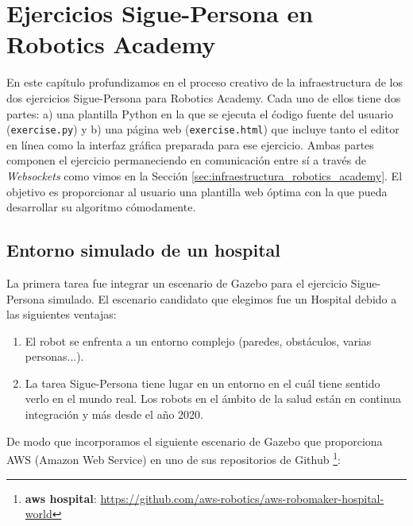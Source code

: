 \chapter{Ejercicios Sigue-Persona en Robotics Academy}
\label{cap:capitulo5}

En este capítulo profundizamos en el proceso creativo de la infraestructura de los dos ejercicios Sigue-Persona para Robotics Academy. Cada uno de ellos tiene dos partes: a) una plantilla Python en la que se ejecuta el ćodigo fuente del usuario (\texttt{exercise.py}) y b) una página web (\texttt{exercise.html}) que incluye tanto el editor en línea como la interfaz gráfica preparada para ese ejercicio. Ambas partes componen el ejercicio permaneciendo en comunicación entre sí a través de \textit{Websockets} como vimos en la Sección \ref{sec:infraestructura_robotics_academy}. El objetivo es proporcionar al usuario una plantilla web óptima con la que pueda desarrollar su algoritmo cómodamente.\\



\section{Entorno simulado de un hospital}
\label{sec:hospital_gazebo}

La primera tarea fue integrar un escenario de Gazebo para el ejercicio Sigue-Persona simulado. El escenario candidato que elegimos fue un Hospital debido a las siguientes ventajas:

\begin{enumerate}
	\item El robot se enfrenta a un entorno complejo (paredes, obstáculos, varias personas...).
	\item La tarea Sigue-Persona tiene lugar en un entorno en el cuál tiene sentido verlo en el mundo real. Los robots en el ámbito de la salud están en continua integración y más desde el año 2020.
\end{enumerate}

De modo que incorporamos el siguiente escenario de Gazebo que proporciona AWS (Amazon Web Service) en uno de sus repositorios de Github \footnote{\textbf{aws hospital}: \url{https://github.com/aws-robotics/aws-robomaker-hospital-world}}:\\

